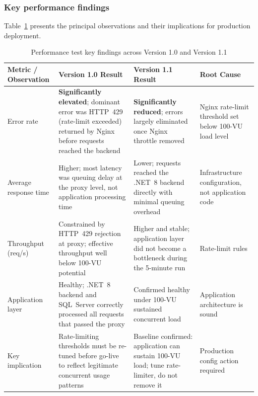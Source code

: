 \subsubsection{Key performance findings}

Table~\ref{tab:perf-findings} presents the principal observations and their
implications for production deployment.

\begin{table}[H]
  \vspace{2ex}
  \centering
  \footnotesize
  {%
  \setlength{\tabcolsep}{5pt}
  \renewcommand{\arraystretch}{1.3}
  \begin{tabular}{|>{\raggedright\arraybackslash}p{}|
                  >{\raggedright\arraybackslash}p{}|
                  >{\raggedright\arraybackslash}p{}|
                  >{\raggedright\arraybackslash}p{}|}
    \hline
    \textbf{Metric / Observation} & \textbf{Version 1.0 Result} & \textbf{Version 1.1 Result} & \textbf{Root Cause} \\
    \hline\hline
    Error rate & \textbf{Significantly elevated}; dominant error was HTTP~429 (rate-limit exceeded) returned by Nginx before requests reached the backend & \textbf{Significantly reduced}; errors largely eliminated once Nginx throttle removed & Nginx rate-limit threshold set below 100-VU load level \\
    \hline
    Average response time & Higher; most latency was queuing delay at the proxy level, not application processing time & Lower; requests reached the .NET~8 backend directly with minimal queuing overhead & Infrastructure configuration, not application code \\
    \hline
    Throughput (req/s) & Constrained by HTTP~429 rejection at proxy; effective throughput well below 100-VU potential & Higher and stable; application layer did not become a bottleneck during the 5-minute run & Rate-limit rules \\
    \hline
    Application layer & Healthy; .NET~8 backend and SQL~Server correctly processed all requests that passed the proxy & Confirmed healthy under 100-VU sustained concurrent load & Application architecture is sound \\
    \hline
    Key implication & Rate-limiting thresholds must be re-tuned before go-live to reflect legitimate concurrent usage patterns & Baseline confirmed: application can sustain 100-VU load; tune rate-limiter, do not remove it & Production config action required \\
    \hline
  \end{tabular}
  }%
  \vspace{2ex}
  \captionsetup{type=table}
  \caption{Performance test key findings across Version 1.0 and Version 1.1}
  \label{tab:perf-findings}
\end{table}

